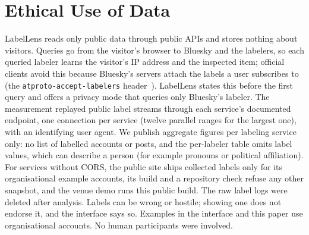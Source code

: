\section{Ethical Use of Data}
\label{sec:ethics}
LabelLens reads only public data through public APIs and stores nothing about visitors. Queries go from the visitor's browser to Bluesky and the labelers, so each queried labeler learns the visitor's IP address and the inspected item; official clients avoid this because Bluesky's servers attach the labels a user subscribes to (the \texttt{atproto-accept-labelers} header~\cite{ATProto_labels}). LabelLens states this before the first query and offers a privacy mode that queries only Bluesky's labeler. The measurement replayed public label streams through each service's documented endpoint, one connection per service (twelve parallel ranges for the largest one), with an identifying user agent. We publish aggregate figures per labeling service only: no list of labelled accounts or posts, and the per-labeler table omits label values, which can describe a person (for example pronouns or political affiliation). For services without CORS, the public site ships collected labels only for its organisational example accounts, its build and a repository check refuse any other snapshot, and the venue demo runs this public build. The raw label logs were deleted after analysis. Labels can be wrong or hostile; showing one does not endorse it, and the interface says so. Examples in the interface and this paper use organisational accounts. No human participants were involved.
